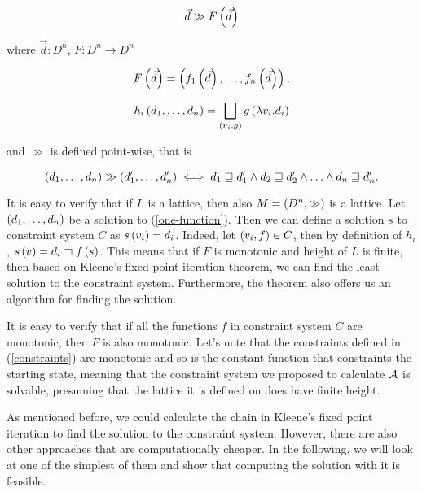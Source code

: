 \documentclass[..thesis.tex]{subfiles}
\begin{document}
\begin{equation}
  \label{one-function}
  \vec{d} \gg F \left( \vec{d}  \right) 
\end{equation}


where $\vec{d} : D^n$, $F :  D^{n} \to D^{n}$

\begin{equation*}
  F \left( \vec{d} \right)  = \left( f_1 \left( \vec{d} \right) , \ldots, f_n \left( \vec{d} \right) \right) \text{,}
\end{equation*}   


\begin{equation*}
  h_i \left( d_1, \ldots, d_n \right) = \bigsqcup_{\left( v_i, g \right)} g \left( \lambda v_i. d_i \right)
\end{equation*}

and $\gg$ is defined point-wise, that is 

\begin{equation*}
\left( d_1, \ldots, d_n \right) \gg \left( d_1', \ldots, d_n' \right) \iff  d_1 \sqsupseteq d_1' \land d_2 \sqsupseteq d_2' \land \ldots \land d_n \sqsupseteq d_n' \text{.}
\end{equation*}

It is easy to verify that if $L$ is a lattice, then also $M = \left( D^n, \gg \right)$ is a lattice. Let $\left( d_1, \ldots, d_n \right) $ be a solution to (\ref{one-function}).
Then we can define a solution $s$ to constraint system $C$ as $s \left( v_i \right) = d_i$. Indeed, let $ \left( v_i, f \right) \in C$, then by definition of $h_i$, $s \left( v \right) = d_i \sqsupset f \left( s \right)$.
This means that if $F$ is monotonic and height of $L$ is finite, then based on Kleene's fixed point iteration theorem,
we can find the least solution to the constraint system. Furthermore, the theorem also offers us an algorithm for finding the solution.

It is easy to verify that if all the functions $f$ in constraint system $C$ are monotonic, then $F$ is also monotonic.
Let's note that the constraints defined in (\ref{constraints}) are monotonic and so is the constant function that constraints the starting state,
meaning that the constraint system we proposed to calculate $\mathcal{A}$ is solvable, presuming that the lattice it is defined on does have finite height.


As mentioned before, we could calculate the chain in Kleene's fixed point iteration to find the solution to the constraint system.
However, there are also other approaches that are computationally cheaper.
In the following, we will look at one of the simplest of them and show that computing the solution with it is feasible.
\end{document}
